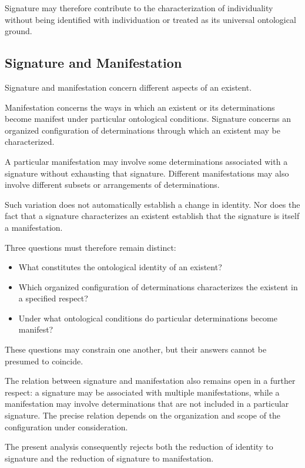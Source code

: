 Signature may therefore contribute to the
characterization of individuality without being
identified with individuation or treated as its
universal ontological ground.

\subsection{Signature and Manifestation}

Signature and manifestation concern different
aspects of an existent.

Manifestation concerns the ways in which an existent
or its determinations become manifest under
particular ontological conditions. Signature
concerns an organized configuration of determinations
through which an existent may be characterized.

A particular manifestation may involve some
determinations associated with a signature without
exhausting that signature. Different manifestations
may also involve different subsets or arrangements
of determinations.

Such variation does not automatically establish
a change in identity. Nor does the fact that a
signature characterizes an existent establish
that the signature is itself a manifestation.

Three questions must therefore remain distinct:

\begin{itemize}
    \item What constitutes the ontological identity
    of an existent?

    \item Which organized configuration of
    determinations characterizes the existent
    in a specified respect?

    \item Under what ontological conditions do
    particular determinations become manifest?
\end{itemize}

These questions may constrain one another, but
their answers cannot be presumed to coincide.

The relation between signature and manifestation
also remains open in a further respect: a signature
may be associated with multiple manifestations,
while a manifestation may involve determinations
that are not included in a particular signature.
The precise relation depends on the organization
and scope of the configuration under consideration.

The present analysis consequently rejects both
the reduction of identity to signature and the
reduction of signature to manifestation.

